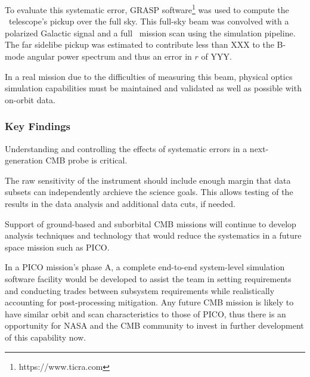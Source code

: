 \documentclass[PICOReport.tex]{subfiles}
\begin{document}
To evaluate this systematic error, GRASP software\footnote{https://www.ticra.com} was used to compute the \pico\ telescope's pickup over the full sky.  This full-sky beam was convolved with a polarized Galactic signal and a full \pico\ mission scan using the simulation pipeline.  The far sidelibe pickup was estimated to contribute less than XXX to the B-mode angular power spectrum and thus an error in $r$ of YYY.

In a real mission due to the difficulties of measuring this beam, physical optics simulation capabilities must be maintained and validated as well as possible with on-orbit data.

\subsubsection{Key Findings}
Understanding and controlling the effects of systematic errors in a
next-generation CMB probe is critical.

The raw sensitivity of the instrument should include enough margin
that data subsets can independently archieve the science goals.
This allows testing of the results in the data analysis and additional
data cuts, if needed.

Support of ground-based and suborbital CMB missions will continue to develop analysis techniques and technology that would reduce the systematics in a future space mission such as PICO.

In a PICO mission's phase A, a complete end-to-end system-level
simulation software facility would be developed to assist the team in setting 
requirements and conducting trades between subsystem requirements while
realistically accounting for post-processing mitigation.  Any future
CMB mission is likely to have similar orbit  
and scan characteristics to those of PICO, thus there is an opportunity for NASA and
the CMB community to invest in further development of this capability now.
\end{document}
